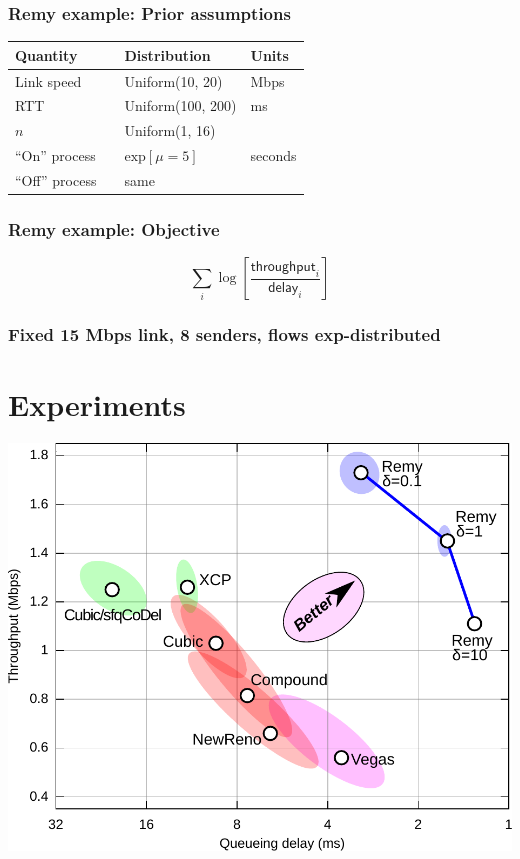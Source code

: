 \documentclass[svgnames]{beamer}
\begin{document}
\begin{frame}
\frametitle{Remy example: Prior assumptions}

\large

\begin{tabular}{llll}
\bf Quantity & & \bf Distribution & \bf Units \\

\hline Link speed & & Uniform(10, 20) & Mbps \\

RTT & & Uniform(100, 200) & ms \\

$n$ & & Uniform(1, 16) \\

``On'' process & & $\mathrm{exp}[\mu = 5]$ & seconds \\

``Off'' process & & same \\

\end{tabular}

\end{frame}

\begin{frame}
\frametitle{Remy example: Objective}

\LARGE

\[\sum_i \log \left[ \frac{\textsf{throughput}_i}{\textsf{delay}_i} \right]\]

\end{frame}



\begin{frame}
\frametitle{Fixed 15 Mbps link, 8 senders, flows exp-distributed}

\section{Experiments}

\noindent \includegraphics[width=8.5 cm]{eth8-final-bytes.pdf}

\end{frame}
\end{document}
